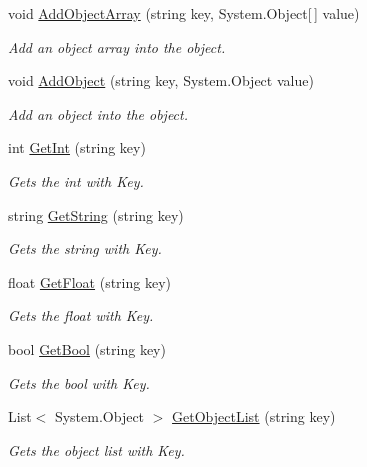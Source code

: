 \begin{DoxyCompactItemize}
void \hyperlink{class_scaffolding_1_1_s_object_ada60ea0906706ebbfc10e04570aafa28}{Add\-Object\-Array} (string key, System.\-Object\mbox{[}$\,$\mbox{]} value)
\begin{DoxyCompactList}\small\item\em Add an object array into the object. \end{DoxyCompactList}\item 
void \hyperlink{class_scaffolding_1_1_s_object_a88d180b12997208394f7c7a5940b67bf}{Add\-Object} (string key, System.\-Object value)
\begin{DoxyCompactList}\small\item\em Add an object into the object. \end{DoxyCompactList}\item 
int \hyperlink{class_scaffolding_1_1_s_object_adbad6746e1fbc0339f6ec2fb650ab6a1}{Get\-Int} (string key)
\begin{DoxyCompactList}\small\item\em Gets the int with Key. \end{DoxyCompactList}\item 
string \hyperlink{class_scaffolding_1_1_s_object_a6c52bfa3a63b544e2b894655f4214455}{Get\-String} (string key)
\begin{DoxyCompactList}\small\item\em Gets the string with Key. \end{DoxyCompactList}\item 
float \hyperlink{class_scaffolding_1_1_s_object_ab72b3f6b94c3a06522d8b2f9c2def605}{Get\-Float} (string key)
\begin{DoxyCompactList}\small\item\em Gets the float with Key. \end{DoxyCompactList}\item 
bool \hyperlink{class_scaffolding_1_1_s_object_a94ad6ed5838a7175ed8b56308366885e}{Get\-Bool} (string key)
\begin{DoxyCompactList}\small\item\em Gets the bool with Key. \end{DoxyCompactList}\item 
List$<$ System.\-Object $>$ \hyperlink{class_scaffolding_1_1_s_object_a4bcc3932ccdbca7def14a51da52cd98c}{Get\-Object\-List} (string key)
\begin{DoxyCompactList}\small\item\em Gets the object list with Key. \end{DoxyCompactList}\item 

\end{DoxyCompactItemize}
